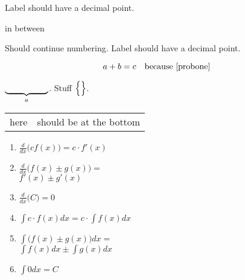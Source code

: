 \documentclass[10pt]{book}
\begin{document}
\begin{sectionexercises}
\item\label{probone} Label should have a decimal point.
\end{sectionexercises}
in between
\begin{sectionexercises}
\item Should continue numbering. Label should have a decimal point.
\end{sectionexercises}

\[a+b=c\quad\text{because \ref{probone}}\]

$\underbrace{\makebox[1.8cm]{}}_a$.  Stuff $\left\{\rule{0pt}{12pt}\right\}$.


\begin{tabular}{cc}
here & \multirow{1.5}{*}{should be at the bottom}
\end{tabular}

\parbox[t]{\linewidth}{\begin{multicols}{2}
\begin{enumerate}
\item\label{thm:d_const_mult_rule} $\frac{d}{d x}\bigl(cf(x) \bigr) = c\cdot f'(x)$
\item\label{thm:d_sum_diff_rule} $\frac{d}{d x}\bigl(f(x)\pm g(x) \bigr) =$ \\
\null\qquad$f'(x)\pm g'(x)$
\item $\frac{d}{d x}\bigl(C \bigr) = 0$
\setcounter{enumi}{0}
\item $\int c\cdot f(x)d x = c\cdot \int f(x)d x$
\item $\int \bigl(f(x)\pm g(x)\bigr)d x =$ \\
\null\qquad$\int f(x)d x\pm \int g(x)d x$
\item $\int 0d x = C$
\end{enumerate}
\end{multicols}}
\end{document}
